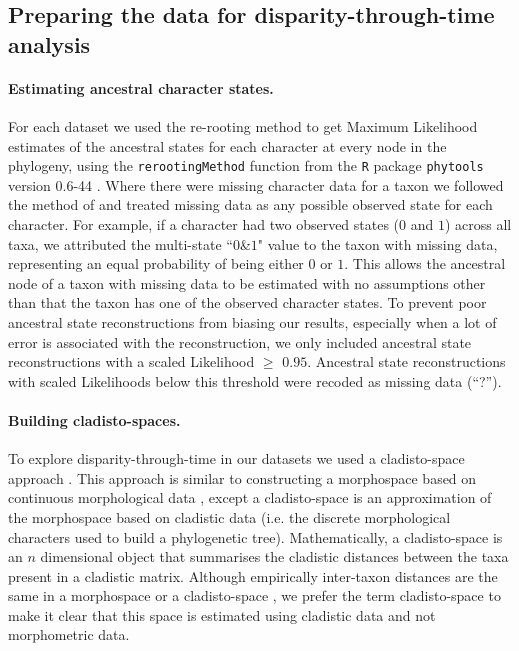 \documentclass[12pt,a4paper]{article}
\begin{document}
\subsection{Preparing the data for disparity-through-time analysis}

\paragraph{Estimating ancestral character states.}
\label{ace}
For each dataset we used the re-rooting method \citep{Yang01121995,Garland2000} to get Maximum Likelihood estimates of the ancestral states for each character at every node in the phylogeny, using the \texttt{rerootingMethod} function from the \texttt{R} package \texttt{phytools} version 0.6-44 \citep{phytools,R}.
Where there were missing character data for a taxon we followed the method of \cite{Claddis} and treated missing data as any possible observed state for each character.
For example, if a character had two observed states ($0$ and $1$) across all taxa, we attributed the multi-state ``$0$\&$1$" value to the taxon with missing data, representing an equal probability of being either $0$ or $1$.
This allows the ancestral node of a taxon with missing data to be estimated with no assumptions other than that the taxon has one of the observed character states.
To prevent poor ancestral state reconstructions from biasing our results, especially when a lot of error is associated with the reconstruction, we only included ancestral state reconstructions with a scaled Likelihood $\geq$ $0.95$.
Ancestral state reconstructions with scaled Likelihoods below this threshold were recoded as missing data (``?'').

\paragraph{Building cladisto-spaces.} 
To explore disparity-through-time in our datasets we used a cladisto-space approach \citep[e.g.][]{Foote01071994,Foote29111996,Wesley-Hunt2005,Brusatte12092008,friedmanexplosive2010,toljagictriassic-jurassic2013,Hughes20082013}.
This approach is similar to constructing a morphospace based on continuous morphological data \citep[e.g.][]{friedmanexplosive2010}, except a cladisto-space is an approximation of the morphospace based on cladistic data (i.e. the discrete morphological characters used to build a phylogenetic tree).
Mathematically, a cladisto-space is an $n$ dimensional object that summarises the cladistic distances between the taxa present in a cladistic matrix.
Although empirically inter-taxon distances are the same in a morphospace or a cladisto-space \citep{foth2012different,hetherington2015cladistic}, we prefer the term cladisto-space to make it clear that this space is estimated using cladistic data and not morphometric data.
\end{document}
